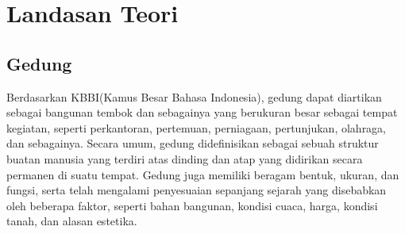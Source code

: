 \chapter{Landasan Teori}
\label{chap:teori}

\section{Gedung \cite{gedung}}
\label{sec:skripsi} 
Berdasarkan KBBI(Kamus Besar Bahasa Indonesia), gedung dapat diartikan sebagai bangunan tembok dan sebagainya yang berukuran besar sebagai tempat kegiatan, seperti perkantoran, pertemuan, perniagaan, pertunjukan, olahraga, dan sebagainya. Secara umum, gedung didefinisikan sebagai sebuah struktur buatan manusia yang terdiri atas dinding dan atap yang didirikan secara permanen di suatu tempat. Gedung juga memiliki beragam bentuk, ukuran, dan fungsi, serta telah mengalami penyesuaian sepanjang sejarah yang disebabkan oleh beberapa faktor, seperti bahan bangunan, kondisi cuaca, harga, kondisi tanah, dan alasan estetika.
